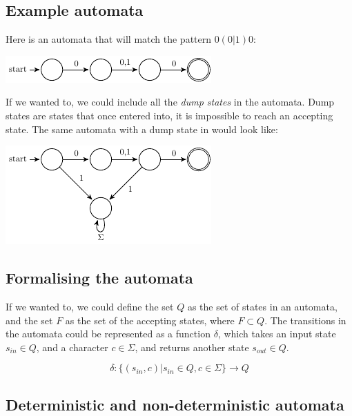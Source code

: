 \subsection*{Example automata}

Here is an automata that will match the pattern $0(0|1)0$:

\begin{center}
	\includegraphics{automata/1.pdf}
\end{center}

If we wanted to, we could include all the {\it dump states} in the automata.
Dump states are states that once entered into, it is impossible to reach an
accepting state. The same automata with a dump state in would look like:

\begin{center}
	\includegraphics{automata/2.pdf}
\end{center}

\subsection*{Formalising the automata}

If we wanted to, we could define the set $Q$ as the set of states in an
automata, and the set $F$ as the set of the accepting states, where $F \subset
Q$. The transitions in the automata could be represented as a function $\delta$,
which takes an input state $s_{in} \in Q$, and a character $c \in \Sigma$, and
returns another state $s_{out} \in Q$.

\[
	\delta:\{(s_{in},c)| s_{in} \in Q, c \in \Sigma\} \rightarrow Q
\]


\subsection*{Deterministic and non-deterministic automata}

